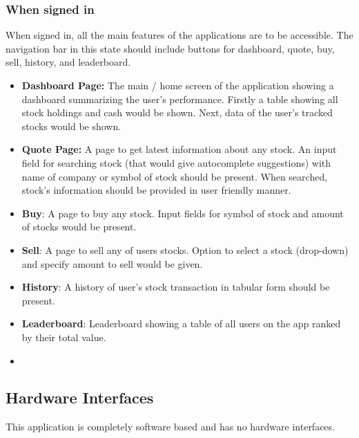 \documentclass[12 pt, a4paper]{report}
\begin{document}
	\subsubsection{When signed in}
	When signed in, all the main features of the applications are to be accessible. The navigation bar in this state should include buttons for dashboard, quote, buy, sell, history, and leaderboard.
	\begin{itemize}
		\item \textbf{Dashboard Page:} The main / home screen of the application showing a dashboard summarizing the user's performance. Firstly a table showing all stock holdings and cash would be shown. Next, data of the user's tracked stocks would  be shown.
		\item \textbf{Quote Page: } A page to get latest information about any stock. An input field for searching stock (that would give autocomplete suggestions) with name of company or symbol of stock should be present. When searched, stock's information should be provided in user friendly manner.
		\item \textbf{Buy}: A page to buy any stock. Input fields for symbol of stock and amount of stocks would be present.
		\item \textbf{Sell}: A page to sell any of users stocks. Option to select a stock (drop-down) and specify amount to sell would be given.
		\item \textbf{History}: A history of user's stock transaction in tabular form should be present.
		\item \textbf{Leaderboard}: Leaderboard showing a table of all users on the app ranked by their total value.
		\item
	\end{itemize}
	
	\subsection {Hardware Interfaces}
	This application is completely software based and has no hardware interfaces.
	
\end{document}

